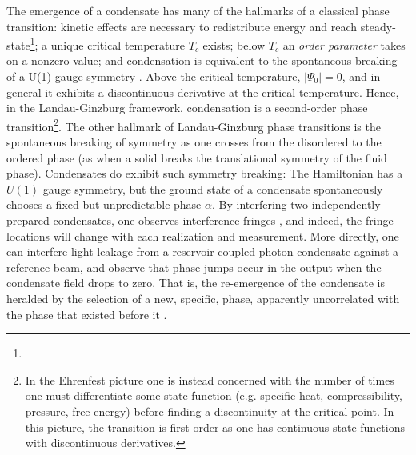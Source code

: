 	The emergence of a condensate has many of the hallmarks of a classical phase transition: kinetic effects are necessary to redistribute energy and reach steady-state\footnote{}; a unique critical temperature $T_c$ exists; below $T_c$ an \emph{order parameter} takes on a nonzero value; and condensation is equivalent to the spontaneous breaking of a U(1) gauge symmetry \cite{yukalov11_symmetry}. Above the critical temperature, $|\Psi_0|=0$, and in general it exhibits a discontinuous derivative at the critical temperature. Hence, in the Landau-Ginzburg framework, condensation is a second-order phase transition\footnote{In the Ehrenfest picture one is instead concerned with the number of times one must differentiate some state function (e.g. specific heat, compressibility, pressure, free energy) before finding a discontinuity at the critical point. In this picture, the transition is first-order as one has continuous state functions with discontinuous derivatives.}. The other hallmark of Landau-Ginzburg phase transitions is the spontaneous breaking of symmetry as one crosses from the disordered to the ordered phase (as when a solid breaks the translational symmetry of the fluid phase). Condensates do exhibit such symmetry breaking: The Hamiltonian has a $U(1)$ gauge symmetry, but the ground state of a condensate spontaneously chooses a fixed but unpredictable phase $\alpha$. By interfering two independently prepared condensates, one observes interference fringes \cite{andrews97}, and indeed, the fringe locations will change with each realization and measurement. More directly, one can interfere light leakage from a reservoir-coupled photon condensate against a reference beam, and observe that phase jumps occur in the output when the condensate field drops to zero. That is, the re-emergence of the condensate is heralded by the selection of a new, specific, phase, apparently uncorrelated with the phase that existed before it \cite{schmitt16}. 
	
